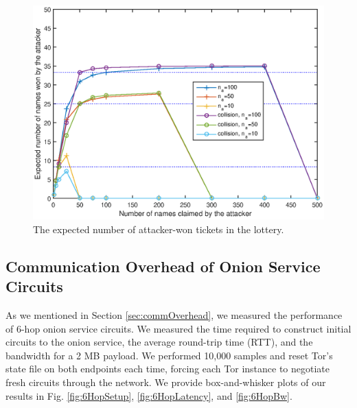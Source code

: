 \documentclass[USenglish,oneside,twocolumn]{article}
\begin{document}
\begin{figure}[t!]
	\centering
	\includegraphics[width=\linewidth]{../assets/images/winners-allcases.eps}
	\caption{The expected number of attacker-won tickets in the lottery.}
	\label{fig:lottery}
	\vspace{-10pt}
\end{figure}

\newpage

\subsection{Communication Overhead of Onion Service Circuits}
\label{sec:commOverheadAppendix}


As we mentioned in Section \ref{sec:commOverhead}, we measured the performance of 6-hop onion service circuits. We measured the time required to construct initial circuits to the onion service, the average round-trip time (RTT), and the bandwidth for a 2 MB payload. We performed 10,000 samples and reset Tor's state file on both endpoints each time, forcing each Tor instance to negotiate fresh circuits through the network. We provide box-and-whisker plots of our results in Fig. \ref{fig:6HopSetup}, \ref{fig:6HopLatency}, and \ref{fig:6HopBw}.
\end{document}
